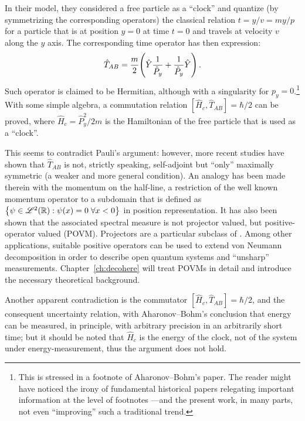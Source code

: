 In their model, they considered a free particle as a ``clock''
and quantize (by symmetrizing the corresponding operators)
the classical relation
$t = y / v = m y / p$
for a particle that is at position $y = 0$ at time $t = 0$ and travels at velocity $v$ along the $y$ axis.
The corresponding time operator has then expression:
\begin{equation}
  \hat{T}_{AB} = \frac{m}{2} \qty( \hat{Y} \frac{1}{\hat{P}_y} + \frac{1}{\hat{P}_y} \hat{Y} ) \,\text{.}
\end{equation}
Such operator is claimed to be Hermitian, although with a singularity for $p_{y} = 0$.\footnote{
  This is stressed in a footnote of Aharonov--Bohm's paper.
  The reader might have noticed the irony of fundamental historical papers
  relegating important information at the level of footnotes
  ---and the present work, in many parts, not even ``improving'' such a traditional trend.
}
With some simple algebra, a commutation relation $[\hat{H}_{c}, \hat{T}_{AB}] = \hbar/2$
can be proved, where $\hat{H}_c = \hat{P}_y^2/2m$ is the Hamiltonian of the free particle that is used as a ``clock''.

This seems to contradict Pauli's argument: however, more recent studies
\parencite{MugaAB98, MugaAB99, MugaAB99Err}
have shown that
$\hat{T}_{AB}$ is not, strictly speaking, self-adjoint but ``only'' maximally symmetric
(a weaker and more general condition).
An analogy has been made therein with the momentum on the half-line,
a restriction of the well known momentum operator to a subdomain
that is defined as
$\qty{\psi \in \mathcal{L}^2(\mathbb{R}): \psi(x) = 0 \; \forall x < 0}$ in position representation.
It has also been shown that the associated spectral measure is not projector valued, but
positive-operator valued (POVM). Projectors are a particular subclass of .
Among other applications, suitable positive operators can be used to extend von Neumann decomposition
in order to describe
open quantum systems and ``unsharp'' measurements.
Chapter~\ref{ch:decohere} will treat POVMs in detail and introduce the necessary
theoretical background.

Another apparent contradiction is the commutator $[\hat{H}_{c}, \hat{T}_{AB}] = \hbar/2$,
and the consequent uncertainty relation, with Aharonov--Bohm's conclusion that
energy can be measured, in principle, with arbitrary precision in an arbitrarily short time;
but it should be noted that $\hat{H}_{c}$ is the energy of the clock, not of the system under energy-measurement,
thus the argument does not hold.

